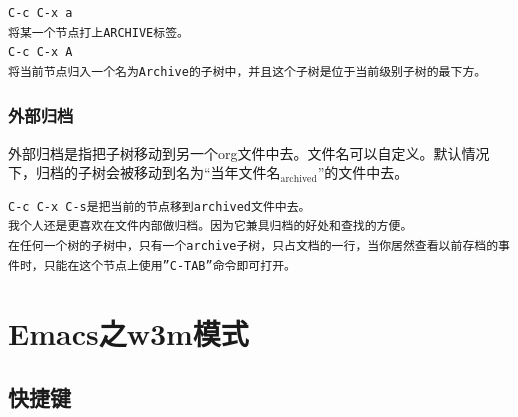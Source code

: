 \documentclass[11pt]{article}
\begin{document}
\begin{verbatim}
C-c C-x a
将某一个节点打上ARCHIVE标签。
C-c C-x A
将当前节点归入一个名为Archive的子树中，并且这个子树是位于当前级别子树的最下方。
\end{verbatim}
\subsubsection{外部归档}
\label{sec-7-6-2}

    外部归档是指把子树移动到另一个org文件中去。文件名可以自定义。默认情况下，归档的子树会被移动到名为“当年文件名$_{\mathrm{archived}}$”的文件中去。
    

\begin{verbatim}
C-c C-x C-s是把当前的节点移到archived文件中去。
我个人还是更喜欢在文件内部做归档。因为它兼具归档的好处和查找的方便。
在任何一个树的子树中，只有一个archive子树，只占文档的一行，当你居然查看以前存档的事件时，只能在这个节点上使用”C-TAB”命令即可打开。
\end{verbatim}
\section{Emacs之w3m模式}
\label{sec-8}
\subsection{快捷键}
\label{sec-8-1}
\end{document}
